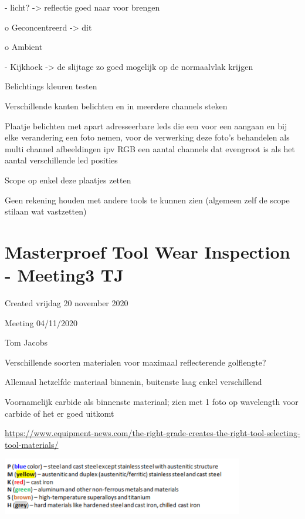 \documentclass{article}
\begin{document}
-	licht? -\textgreater{} reflectie goed naar voor brengen

o	Geconcentreerd -\textgreater{} dit

o	Ambient 

-	Kijkhoek -\textgreater{} de slijtage zo goed mogelijk op de normaalvlak krijgen

Belichtings kleuren testen



Verschillende kanten belichten en in meerdere channels steken

Plaatje belichten met apart adresseerbare leds die een voor een aangaan en bij elke verandering een foto nemen, voor de verwerking deze foto’s behandelen als multi channel afbeeldingen ipv RGB een aantal channels dat evengroot is als het aantal verschillende led posities



Scope op enkel deze plaatjes zetten

Geen rekening houden met andere tools te kunnen zien (algemeen zelf de scope stilaan wat vastzetten) 


		\section{Masterproef Tool Wear Inspection - Meeting3 TJ}

Created vrijdag 20 november 2020



Meeting 04/11/2020



Tom Jacobs



Verschillende soorten materialen voor maximaal reflecterende golflengte?

	Allemaal hetzelfde materiaal binnenin, buitenste laag enkel verschillend
	
	Voornamelijk carbide als binnenste materiaal; zien met 1 foto op wavelength voor carbide of het er goed uitkomt
	
	\href{https://www.equipment-news.com/the-right-grade-creates-the-right-tool-selecting-tool-materials/}{https://www.equipment-news.com/the-right-grade-creates-the-right-tool-selecting-tool-materials/}
	
	

	 \includegraphics[width=4.166667in, keepaspectratio=true]{./ZimFiles_files/Verslagen/Activiteiten_rapport/Activities/Masterproef_Tool_Wear_Inspection_-_Meeting3_TJ/Types_sterkte_plaatjes.png}
	
\end{document}
